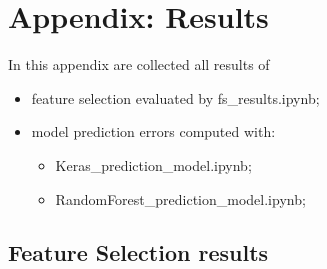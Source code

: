 \chapter{Appendix: Results}
\label{chap:appendix}
In this appendix are collected all results of
\begin{itemize}
    \item feature selection evaluated by fs\_results.ipynb;
    \item model prediction errors computed with:
    \begin{itemize}
        \item Keras\_prediction\_model.ipynb;
        \item RandomForest\_prediction\_model.ipynb;
    \end{itemize}  
\end{itemize}
\section{Feature Selection results}
